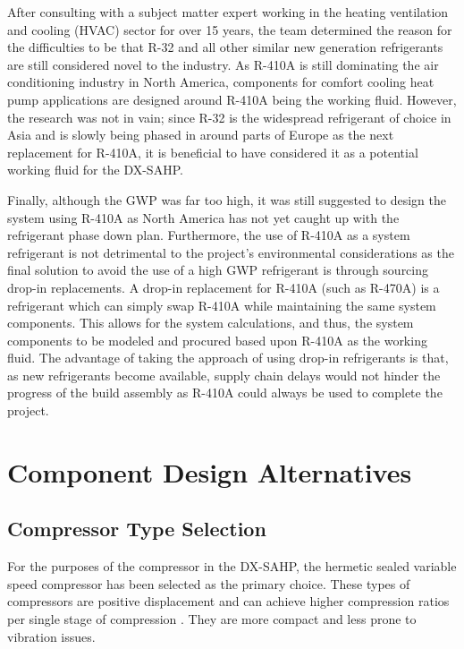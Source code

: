 \medskip
After consulting with a subject matter expert working in the heating ventilation and cooling (HVAC) sector for over 15 years, the team determined the reason for the difficulties to be that R-32 and all other similar new generation refrigerants are still considered novel to the industry. As R-410A is still dominating the air conditioning industry in North America, components for comfort cooling heat pump applications are designed around R-410A being the working fluid. However, the research was not in vain; since R-32 is the widespread refrigerant of choice in Asia and is slowly being phased in around parts of Europe as the next replacement for R-410A, it is beneficial to have considered it as a potential working fluid for the DX-SAHP.

\medskip
Finally, although the GWP was far too high, it was still suggested to design the system using R-410A as North America has not yet caught up with the refrigerant phase down plan. Furthermore, the use of R-410A as a system refrigerant is not detrimental to the project’s environmental considerations as the final solution to avoid the use of a high GWP refrigerant is through sourcing drop-in replacements. A drop-in replacement for R-410A (such as R-470A) is a refrigerant which can simply swap R-410A while maintaining the same system components. This allows for the system calculations, and thus, the system components to be modeled and procured based upon R-410A as the working fluid. The advantage of taking the approach of using drop-in refrigerants is that, as new refrigerants become available, supply chain delays would not hinder the progress of the build assembly as R-410A could always be used to complete the project.

\section{Component Design Alternatives}

\subsection{Compressor Type Selection}

For the purposes of the compressor in the DX-SAHP, the hermetic sealed variable speed compressor has been selected as the primary choice. These types of compressors are positive displacement and can achieve higher compression ratios per single stage of compression \cite{other_compressors}. They are more compact and less prone to vibration issues.

